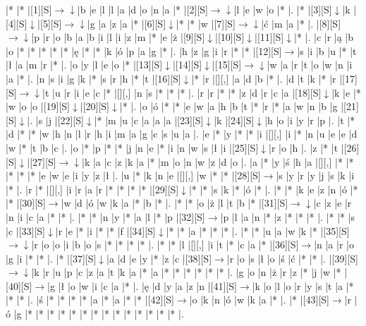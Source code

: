 \documentclass[11pt]{article}
\newcommand\drarr{$\rightarrow \!\!\!\!\! \downarrow$}
\newcommand\rarr{$\rightarrow$}
\newcommand\darr{$\downarrow$}
\begin{document}
\noindent\begin{Puzzle}{18}{29}|*	|*	|[1][S]\drarr	|b	|e	|l	|l	|a	|d	|o	|n	|a	|*	|[2][S]\drarr	|l	|e	|w	|o	|*	|.
|*	|[3][S]\darr	|k	|[4][S]\darr	|[5][S]\drarr	|g	|a	|z	|a	|*	|[6][S]\darr	|*	|*	|w	|[7][S]\drarr	|ć	|m	|a	|*	|.
|[8][S]\drarr	|p	|r	|o	|b	|a	|b	|i	|l	|i	|z	|m	|*	|e	|ż	|[9][S]\darr	|[10][S]\darr	|[11][S]\darr	|*	|.
|c	|r	|ą	|b	|o	|*	|*	|*	|*	|*	|ę	|*	|*	|k	|ó	|p	|a	|g	|*	|.
|h	|z	|g	|i	|r	|*	|*	|[12][S]\rarr	|s	|i	|b	|u	|*	|t	|ł	|a	|m	|r	|*	|.
|o	|y	|l	|e	|o	|*	|[13][S]\darr	|[14][S]\darr	|[15][S]\drarr	|w	|a	|r	|t	|o	|w	|n	|i	|a	|*	|.
|n	|s	|i	|g	|k	|*	|s	|r	|h	|*	|t	|[16][S]\darr	|*	|r	|[][,]{ }	|a	|d	|b	|*	|.
|d	|t	|k	|*	|r	|[17][S]\drarr	|t	|u	|r	|i	|e	|c	|*	|[][,]{ }	|n	|s	|*	|*	|*	|.
|r	|r	|*	|*	|z	|d	|r	|c	|a	|[18][S]\darr	|k	|e	|*	|w	|o	|o	|[19][S]\darr	|[20][S]\darr	|*	|.
|o	|ó	|*	|*	|e	|w	|a	|h	|b	|t	|*	|r	|*	|a	|w	|n	|b	|g	|[21][S]\darr	|.
|s	|j	|[22][S]\darr	|*	|m	|u	|c	|a	|a	|a	|[23][S]\darr	|k	|[24][S]\darr	|h	|o	|i	|y	|r	|p	|.
|t	|*	|d	|*	|*	|w	|h	|n	|l	|r	|h	|i	|m	|a	|g	|c	|s	|u	|a	|.
|e	|*	|y	|*	|*	|i	|[][,]{ }	|i	|*	|n	|u	|e	|e	|d	|w	|*	|t	|b	|c	|.
|o	|*	|p	|*	|*	|j	|n	|e	|*	|i	|n	|w	|s	|ł	|i	|[25][S]\darr	|r	|o	|h	|.
|z	|*	|t	|[26][S]\darr	|[27][S]\drarr	|k	|a	|c	|z	|k	|a	|*	|m	|o	|n	|w	|z	|d	|o	|.
|a	|*	|y	|ś	|h	|a	|[][,]{ }	|*	|*	|*	|*	|*	|e	|w	|e	|i	|y	|z	|ł	|.
|u	|*	|k	|n	|e	|[][,]{ }	|w	|*	|*	|[28][S]\rarr	|s	|y	|r	|y	|j	|s	|k	|i	|*	|.
|r	|*	|[][,]{ }	|i	|r	|a	|r	|*	|*	|*	|*	|[29][S]\darr	|*	|*	|s	|k	|*	|ó	|*	|.
|*	|*	|k	|e	|z	|n	|ó	|*	|*	|[30][S]\rarr	|w	|d	|ó	|w	|k	|a	|*	|b	|*	|.
|*	|*	|o	|ż	|l	|t	|b	|*	|[31][S]\drarr	|c	|z	|e	|r	|n	|i	|c	|a	|*	|*	|.
|*	|*	|n	|y	|*	|a	|l	|*	|p	|[32][S]\rarr	|p	|l	|a	|n	|*	|z	|*	|*	|*	|.
|*	|*	|s	|c	|[33][S]\darr	|r	|e	|*	|i	|*	|*	|f	|[34][S]\darr	|*	|*	|a	|*	|*	|*	|.
|*	|*	|u	|a	|w	|k	|*	|[35][S]\drarr	|r	|o	|o	|i	|b	|o	|s	|*	|*	|*	|*	|.
|*	|*	|l	|[][,]{ }	|i	|t	|*	|c	|a	|*	|[36][S]\rarr	|n	|a	|r	|o	|g	|i	|*	|*	|.
|*	|[37][S]\darr	|a	|d	|e	|y	|*	|z	|c	|[38][S]\rarr	|r	|o	|s	|ł	|o	|ś	|ć	|*	|*	|.
|[39][S]\drarr	|k	|r	|u	|p	|c	|z	|a	|t	|k	|a	|*	|a	|*	|*	|*	|*	|*	|*	|.
|g	|o	|n	|ż	|r	|z	|*	|j	|w	|*	|[40][S]\rarr	|g	|ł	|o	|w	|i	|c	|a	|*	|.
|ę	|d	|y	|a	|z	|n	|[41][S]\rarr	|k	|o	|l	|o	|r	|y	|s	|t	|a	|*	|*	|*	|.
|ś	|*	|*	|*	|*	|a	|*	|a	|*	|*	|[42][S]\rarr	|o	|k	|n	|ó	|w	|k	|a	|*	|.
|*	|[43][S]\rarr	|r	|ó	|g	|*	|*	|*	|*	|*	|*	|*	|*	|*	|*	|*	|*	|*	|*	|.\end{Puzzle}

\newpage
\end{document}
